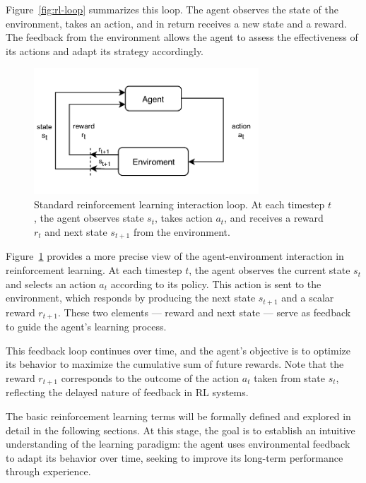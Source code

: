 \documentclass[../Main.tex]{subfiles}
\begin{document}
Figure~\ref{fig:rl-loop} summarizes this loop. The agent observes the state of the environment, takes an action, and in return receives a new state and a reward. The feedback from the environment allows the agent to assess the effectiveness of its actions and adapt its strategy accordingly.

\begin{figure}[H]
    \centering
    \includegraphics[width=0.75\textwidth]{img/rl-summary.png}
    \caption{Standard reinforcement learning interaction loop. At each timestep \(t\), the agent observes state \(s_t\), takes action \(a_t\), and receives a reward \(r_t\) and next state \(s_{t+1}\) from the environment.}
    \label{fig:rl-loop-precise}
\end{figure}

Figure~\ref{fig:rl-loop-precise} provides a more precise view of the agent-environment interaction in reinforcement learning. At each timestep \(t\), the agent observes the current state \(s_t\) and selects an action \(a_t\) according to its policy. This action is sent to the environment, which responds by producing the next state \(s_{t+1}\) and a scalar reward \(r_{t+1}\). These two elements — reward and next state — serve as feedback to guide the agent’s learning process.

This feedback loop continues over time, and the agent’s objective is to optimize its behavior to maximize the cumulative sum of future rewards. Note that the reward \(r_{t+1}\) corresponds to the outcome of the action \(a_t\) taken from state \(s_t\), reflecting the delayed nature of feedback in RL systems.

The basic reinforcement learning terms will be formally defined and explored in detail in the following sections. At this stage, the goal is to establish an intuitive understanding of the learning paradigm: the agent uses environmental feedback to adapt its behavior over time, seeking to improve its long-term performance through experience.
\end{document}
